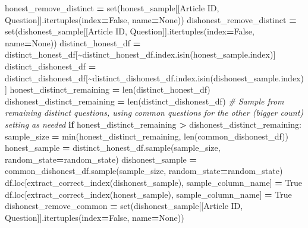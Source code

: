 \documentclass[
]{article}
\newenvironment{Shaded}{\begin{snugshade}}{\end{snugshade}}
\newcommand{\BuiltInTok}[1]{#1}
\newcommand{\CommentTok}[1]{\textcolor[rgb]{0.56,0.35,0.01}{\textit{#1}}}
\newcommand{\ControlFlowTok}[1]{\textcolor[rgb]{0.13,0.29,0.53}{\textbf{#1}}}
\newcommand{\NormalTok}[1]{#1}
\newcommand{\OperatorTok}[1]{\textcolor[rgb]{0.81,0.36,0.00}{\textbf{#1}}}
\newcommand{\StringTok}[1]{\textcolor[rgb]{0.31,0.60,0.02}{#1}}
\newcommand{\VariableTok}[1]{\textcolor[rgb]{0.00,0.00,0.00}{#1}}
\begin{document}
\begin{Shaded}
\begin{Highlighting}[]
\NormalTok{    honest\_remove\_distinct }\OperatorTok{=} \BuiltInTok{set}\NormalTok{(honest\_sample[[}\StringTok{\textquotesingle{}Article ID\textquotesingle{}}\NormalTok{, }\StringTok{\textquotesingle{}Question\textquotesingle{}}\NormalTok{]].itertuples(index}\OperatorTok{=}\VariableTok{False}\NormalTok{, name}\OperatorTok{=}\VariableTok{None}\NormalTok{))}
\NormalTok{    dishonest\_remove\_distinct }\OperatorTok{=} \BuiltInTok{set}\NormalTok{(dishonest\_sample[[}\StringTok{\textquotesingle{}Article ID\textquotesingle{}}\NormalTok{, }\StringTok{\textquotesingle{}Question\textquotesingle{}}\NormalTok{]].itertuples(index}\OperatorTok{=}\VariableTok{False}\NormalTok{, name}\OperatorTok{=}\VariableTok{None}\NormalTok{))}
\NormalTok{    distinct\_honest\_df }\OperatorTok{=}\NormalTok{ distinct\_honest\_df[}\OperatorTok{\textasciitilde{}}\NormalTok{distinct\_honest\_df.index.isin(honest\_sample.index)]}
\NormalTok{    distinct\_dishonest\_df }\OperatorTok{=}\NormalTok{ distinct\_dishonest\_df[}\OperatorTok{\textasciitilde{}}\NormalTok{distinct\_dishonest\_df.index.isin(dishonest\_sample.index)]}
\NormalTok{    honest\_distinct\_remaining }\OperatorTok{=} \BuiltInTok{len}\NormalTok{(distinct\_honest\_df)}
\NormalTok{    dishonest\_distinct\_remaining }\OperatorTok{=} \BuiltInTok{len}\NormalTok{(distinct\_dishonest\_df)}
    \CommentTok{\# Sample from remaining distinct questions, using common questions for the other (bigger count) setting as needed}
    \ControlFlowTok{if}\NormalTok{ honest\_distinct\_remaining }\OperatorTok{\textgreater{}}\NormalTok{ dishonest\_distinct\_remaining:}
\NormalTok{        sample\_size }\OperatorTok{=} \BuiltInTok{min}\NormalTok{(honest\_distinct\_remaining, }\BuiltInTok{len}\NormalTok{(common\_dishonest\_df))}
\NormalTok{        honest\_sample }\OperatorTok{=}\NormalTok{ distinct\_honest\_df.sample(sample\_size, random\_state}\OperatorTok{=}\NormalTok{random\_state)}
\NormalTok{        dishonest\_sample }\OperatorTok{=}\NormalTok{ common\_dishonest\_df.sample(sample\_size, random\_state}\OperatorTok{=}\NormalTok{random\_state)}
\NormalTok{        df.loc[extract\_correct\_index(dishonest\_sample), sample\_column\_name] }\OperatorTok{=} \VariableTok{True}
\NormalTok{        df.loc[extract\_correct\_index(honest\_sample), sample\_column\_name] }\OperatorTok{=} \VariableTok{True}
\NormalTok{        dishonest\_remove\_common }\OperatorTok{=} \BuiltInTok{set}\NormalTok{(dishonest\_sample[[}\StringTok{\textquotesingle{}Article ID\textquotesingle{}}\NormalTok{, }\StringTok{\textquotesingle{}Question\textquotesingle{}}\NormalTok{]].itertuples(index}\OperatorTok{=}\VariableTok{False}\NormalTok{, name}\OperatorTok{=}\VariableTok{None}\NormalTok{))}

\end{Highlighting}
\end{Shaded}
\end{document}
